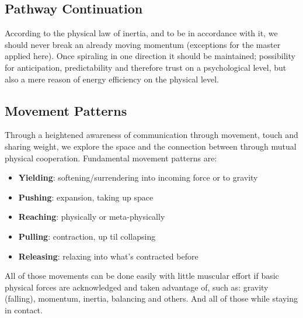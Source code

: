 \subsection{Pathway Continuation}\label{subsec:pathway-continuation}

According to the physical law of inertia, and to be in accordance with it, we should never break an already moving momentum (exceptions for the master applied here).
Once spiraling in one direction it should be maintained; possibility for anticipation, predictability and therefore trust on a psychological level, but also a mere reason of energy efficiency on the physical level.

\subsection{Movement Patterns}\label{subsec:movement-patterns}

Through a heightened awareness of communication through movement, touch and sharing weight, we explore the space and the connection between through mutual physical cooperation.
Fundamental movement patterns are:

\begin{itemize}
    \item \textbf{Yielding}: softening/surrendering into incoming force or to gravity
    \item \textbf{Pushing}: expansion, taking up space
    \item \textbf{Reaching}: physically or meta-physically
    \item \textbf{Pulling}: contraction, up til collapsing
    \item \textbf{Releasing}: relaxing into what's contracted before
\end{itemize}

All of those movements can be done easily with little muscular effort if basic physical forces are acknowledged and taken advantage of, such as: gravity (falling), momentum, inertia, balancing and others.
And all of those while staying in contact.
